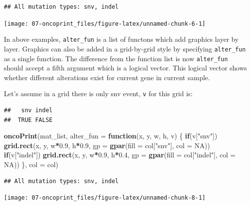 \documentclass[]{book}
\newenvironment{Shaded}{\begin{snugshade}}{\end{snugshade}}
\newcommand{\KeywordTok}[1]{\textcolor[rgb]{0.13,0.29,0.53}{\textbf{#1}}}
\newcommand{\DataTypeTok}[1]{\textcolor[rgb]{0.13,0.29,0.53}{#1}}
\newcommand{\FloatTok}[1]{\textcolor[rgb]{0.00,0.00,0.81}{#1}}
\newcommand{\StringTok}[1]{\textcolor[rgb]{0.31,0.60,0.02}{#1}}
\newcommand{\OtherTok}[1]{\textcolor[rgb]{0.56,0.35,0.01}{#1}}
\newcommand{\ControlFlowTok}[1]{\textcolor[rgb]{0.13,0.29,0.53}{\textbf{#1}}}
\newcommand{\OperatorTok}[1]{\textcolor[rgb]{0.81,0.36,0.00}{\textbf{#1}}}
\newcommand{\NormalTok}[1]{#1}
\theoremstyle{definition}
\theoremstyle{definition}
\theoremstyle{definition}
\theoremstyle{remark}
\begin{document}
\begin{verbatim}
## All mutation types: snv, indel
\end{verbatim}

\begin{center}\texttt{[image: 07-oncoprint\_files/figure-latex/unnamed-chunk-6-1]} \end{center}

In above examples, \texttt{alter\_fun} is a list of functons which add
graphics layer by layer. Graphics can also be added in a grid-by-grid
style by specifying \texttt{alter\_fun} as a single function. The
difference from the function list is now \texttt{alter\_fun} should
accept a fifth argument which is a logical vector. This logical vector
shows whether different alterations exist for current gene in current
sample.

Let's assume in a grid there is only snv event, \texttt{v} for this grid
is:

\begin{verbatim}
##   snv indel 
##  TRUE FALSE
\end{verbatim}

\begin{Shaded}
\begin{Highlighting}[]
\KeywordTok{oncoPrint}\NormalTok{(mat_list,}
    \DataTypeTok{alter_fun =} \ControlFlowTok{function}\NormalTok{(x, y, w, h, v) \{}
        \ControlFlowTok{if}\NormalTok{(v[}\StringTok{"snv"}\NormalTok{]) }\KeywordTok{grid.rect}\NormalTok{(x, y, w}\OperatorTok{*}\FloatTok{0.9}\NormalTok{, h}\OperatorTok{*}\FloatTok{0.9}\NormalTok{, }\DataTypeTok{gp =} \KeywordTok{gpar}\NormalTok{(}\DataTypeTok{fill =}\NormalTok{ col[}\StringTok{"snv"}\NormalTok{], }\DataTypeTok{col =} \OtherTok{NA}\NormalTok{))}
        \ControlFlowTok{if}\NormalTok{(v[}\StringTok{"indel"}\NormalTok{]) }\KeywordTok{grid.rect}\NormalTok{(x, y, w}\OperatorTok{*}\FloatTok{0.9}\NormalTok{, h}\OperatorTok{*}\FloatTok{0.4}\NormalTok{, }\DataTypeTok{gp =} \KeywordTok{gpar}\NormalTok{(}\DataTypeTok{fill =}\NormalTok{ col[}\StringTok{"indel"}\NormalTok{], }\DataTypeTok{col =} \OtherTok{NA}\NormalTok{))}
\NormalTok{    \}, }\DataTypeTok{col =}\NormalTok{ col)}
\end{Highlighting}
\end{Shaded}

\begin{verbatim}
## All mutation types: snv, indel
\end{verbatim}

\begin{center}\texttt{[image: 07-oncoprint\_files/figure-latex/unnamed-chunk-8-1]} \end{center}
\end{document}
